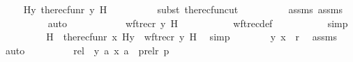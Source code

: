 \begin{isabellebody}
\ \isamarkupfalse%
\ {\isachardoublequoteopen}{\isachardot}{\kern0pt}{\isachardot}{\kern0pt}{\isachardot}{\kern0pt}\ {\isacharequal}{\kern0pt}\ H{\isacharparenleft}{\kern0pt}y{\isacharcomma}{\kern0pt}\ the{\isacharunderscore}{\kern0pt}recfun{\isacharparenleft}{\kern0pt}r{\isacharcomma}{\kern0pt}\ y{\isacharcomma}{\kern0pt}\ H{\isacharparenright}{\kern0pt}{\isacharparenright}{\kern0pt}{\isachardoublequoteclose}\ \isanewline
\ \ \ \ \ \ \ \ \isamarkupfalse%
{\isacharparenleft}{\kern0pt}subst\ the{\isacharunderscore}{\kern0pt}recfun{\isacharunderscore}{\kern0pt}cut{\isacharparenright}{\kern0pt}\isanewline
\ \ \ \ \ \ \ \ \isamarkupfalse%
\ assms\ assms{}\ \isanewline
\ \ \ \ \ \ \ \ \isamarkupfalse%
\ auto\isanewline
\ \ \ \ \ \ \isamarkupfalse%
\ \isamarkupfalse%
\ {\isachardoublequoteopen}{\isachardot}{\kern0pt}{\isachardot}{\kern0pt}{\isachardot}{\kern0pt}\ {\isacharequal}{\kern0pt}\ wftrec{\isacharparenleft}{\kern0pt}r{\isacharcomma}{\kern0pt}\ y{\isacharcomma}{\kern0pt}\ H{\isacharparenright}{\kern0pt}{\isachardoublequoteclose}\ \isanewline
\ \ \ \ \ \ \ \ \isamarkupfalse%
\ wftrec{\isacharunderscore}{\kern0pt}def\ \isanewline
\ \ \ \ \ \ \ \ \isamarkupfalse%
\ simp\isanewline
\ \ \ \ \ \ \isamarkupfalse%
\ \isamarkupfalse%
\ H\ {\isacharcolon}{\kern0pt}\ {\isachardoublequoteopen}the{\isacharunderscore}{\kern0pt}recfun{\isacharparenleft}{\kern0pt}r{\isacharcomma}{\kern0pt}\ x{\isacharcomma}{\kern0pt}\ H{\isacharparenright}{\kern0pt}{\isacharbackquote}{\kern0pt}y\ {\isacharequal}{\kern0pt}\ wftrec{\isacharparenleft}{\kern0pt}r{\isacharcomma}{\kern0pt}\ y{\isacharcomma}{\kern0pt}\ H{\isacharparenright}{\kern0pt}{\isachardoublequoteclose}\ \isamarkupfalse%
\ simp\isanewline
\isanewline
\ \ \ \ \ \ \isamarkupfalse%
\ {\isachardoublequoteopen}{\isacharless}{\kern0pt}y{\isacharcomma}{\kern0pt}\ x{\isachargreater}{\kern0pt}\ {\isasymin}\ r{\isachardoublequoteclose}\ \isamarkupfalse%
\ assms{}\ \isamarkupfalse%
\ auto\isanewline
\ \ \ \ \ \ \isamarkupfalse%
\ \isamarkupfalse%
\ rel\ {\isacharcolon}{\kern0pt}\ {\isachardoublequoteopen}{\isacharless}{\kern0pt}{\isacharless}{\kern0pt}y{\isacharcomma}{\kern0pt}\ a{\isachargreater}{\kern0pt}{\isacharcomma}{\kern0pt}\ {\isacharless}{\kern0pt}x{\isacharcomma}{\kern0pt}\ a{\isachargreater}{\kern0pt}{\isachargreater}{\kern0pt}\ {\isasymin}\ prel{\isacharparenleft}{\kern0pt}r{\isacharcomma}{\kern0pt}\ p{\isacharparenright}{\kern0pt}{\isachardoublequoteclose}\isanewline

\end{isabellebody}
